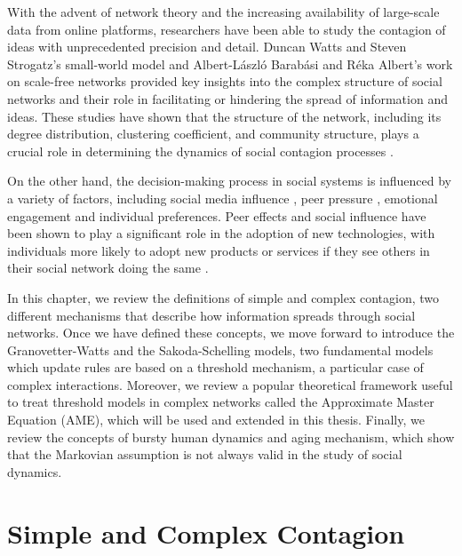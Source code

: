 With the advent of network theory and the increasing availability of large-scale data from online platforms, researchers have been able to study the contagion of ideas with unprecedented precision and detail. Duncan Watts and Steven Strogatz's small-world model \cite{watts1998collective} and Albert-László Barabási and Réka Albert's work on scale-free networks \cite{barabasi2009scale} provided key insights into the complex structure of social networks and their role in facilitating or hindering the spread of information and ideas. These studies have shown that the structure of the network, including its degree distribution, clustering coefficient, and community structure, plays a crucial role in determining the dynamics of social contagion processes \cite{newman2002spread, pastor-satorras-2015}.

On the other hand, the decision-making process in social systems is influenced by a variety of factors, including social media influence \cite{online-platforms, jstor}, peer pressure \cite{jensen-2015}, emotional engagement \cite{ferrara-2015, steinert-2022} and individual preferences. Peer effects and social influence have been shown to play a significant role in the adoption of new technologies, with individuals more likely to adopt new products or services if they see others in their social network doing the same \cite{rogers2014, valente-1996, bollinger-2012}.

In this chapter, we review the definitions of simple and complex contagion, two different mechanisms that describe how information spreads through social networks. Once we have defined these concepts, we move forward to introduce the Granovetter-Watts and the Sakoda-Schelling models, two fundamental models which update rules are based on a threshold mechanism, a particular case of complex interactions. Moreover, we review a popular theoretical framework useful to treat threshold models in complex networks called the Approximate Master Equation (AME), which will be used and extended in this thesis. Finally, we review the concepts of bursty human dynamics and aging mechanism, which show that the Markovian assumption is not always valid in the study of social dynamics.

\section{\label{sec:Simple and Complex Contagion} Simple and Complex Contagion}


